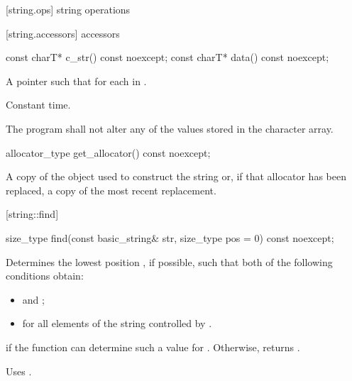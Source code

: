 [string.ops]{ string operations}

[string.accessors]{ accessors}

%
%
\begin{itemdecl}
const charT* c_str() const noexcept;
const charT* data() const noexcept;
\end{itemdecl}

\begin{itemdescr}
\pnum
\returns A pointer  such that  for each
 in .

\pnum
\complexity Constant time.

\pnum
\requires
The program shall not alter any of the values stored in the character array.
\end{itemdescr}

%
%
\begin{itemdecl}
allocator_type get_allocator() const noexcept;
\end{itemdecl}

\begin{itemdescr}
\pnum
\returns
A copy of the
object used to construct the string or, if that allocator has been replaced, a
copy of the most recent replacement.
\end{itemdescr}

[string::find]{}

%
%
\begin{itemdecl}
size_type find(const basic_string& str,
               size_type pos = 0) const noexcept;
\end{itemdecl}

\begin{itemdescr}
\pnum
\effects
Determines the lowest position , if possible, such that both of
the following conditions obtain:

\begin{itemize}
\item
{} and
;
\item
{}%
for all elements  of the string controlled by .
\end{itemize}

\pnum
\returns
{} if the function can determine such a value for .
Otherwise, returns
.

\pnum
\notes
Uses
.
\end{itemdescr}

